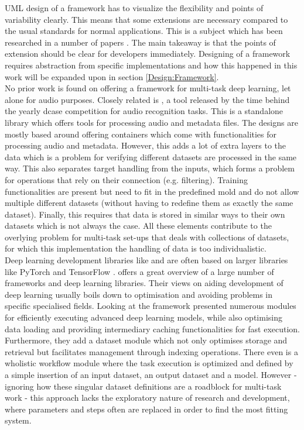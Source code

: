 UML design of a framework has to visualize the flexibility and points of variability clearly. This means that some extensions are necessary compared to the usual standards for normal applications. This is a subject which has been researched in a number of papers \citep{bouassida2001uml} \citep{ben2004uml}. The main takeaway is that the points of extension should be clear for developers immediately. Designing of a framework requires abstraction from specific implementations and how this happened in this work will be expanded upon in section \ref{Design:Framework}. \\

No prior work is found on offering a framework for multi-task deep learning, let alone for audio purposes. Closely related is \cite{dcaserepo2021}, a tool released by the time behind the yearly dcase \cite{dcase} competition for audio recognition tasks. This is a standalone library which offers tools for processing audio and metadata files. The designs are mostly based around offering containers which come with functionalities for processing audio and metadata. However, this adds a lot of extra layers to the data which is a problem for verifying different datasets are processed in the same way. This also separates target handling from the inputs, which forms a problem for operations that rely on their connection (e.g. filtering). Training functionalities are present but need to fit in the predefined mold and do not allow multiple different datasets (without having to redefine them as exactly the same dataset). Finally, this requires that data is stored in similar ways to their own datasets which is not always the case. All these elements contribute to the overlying problem for multi-task set-ups that deals with collections of datasets, for which this implementation the handling of data is too individualistic. \\

Deep learning development libraries like \cite{dong2017tensorlayer} \cite{tokui2019chainer} and \cite{chen2019selene} are often based on larger libraries like PyTorch \cite{paszke2019pytorch} and TensorFlow \cite{tensorflow}. \cite{nguyen2019machine} offers a great overview of a large number of frameworks and deep learning libraries. Their views on aiding development of deep learning usually boils down to optimisation and avoiding problems in specific specialised fields. Looking at \cite{dong2017tensorlayer} the framework presented numerous modules for efficiently executing advanced deep learning  models, while also optimising data loading  and providing intermediary caching functionalities for fast execution. Furthermore, they add a dataset module which not only optimises storage and retrieval but facilitates management through indexing operations. There even is a wholistic workflow module where the task execution is optimized and defined by a simple insertion of an input dataset, an output dataset and a model. However - ignoring how these singular dataset definitions are a roadblock for multi-task work - this approach lacks the exploratory nature of research and development, where parameters and steps often are replaced in order to find the most fitting system. \\

